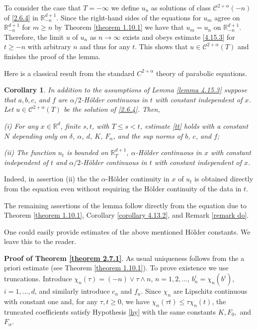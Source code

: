 \documentclass[reqno,12pt]{amsart}
\newtheorem{corollary}[theorem]{Corollary}
\theoremstyle{definition}
\theoremstyle{remark}
\begin{document}
To consider the case that $T=-\infty$ we define $u_{n}$ as
solutions of class ${\mathcal{C}}^{2+\alpha}(-n)$ of \eqref{2.6.4} in
${\mathbb{R}}^{d+1}_{-n}$. Since the right-hand sides of the equations for
$u_{m}$ agree on ${\mathbb{R}}^{d+1}_{-n}$ for $m\geq n$ by Theorem
\ref{theorem 1.10.1} we have that $u_{m}=u_{n}$ on
${\mathbb{R}}^{d+1}_{-n}$. Therefore, the limit $u$ of $u_{n}$ as $n\to\infty$
exists and obeys estimate \eqref{4.15.3} for $t\geq-n$ 
with arbitrary  $n$ and thus for any $t$. This
  shows that
$u\in{\mathcal{C}}^{2+\alpha}(T)$ and finishes the proof of the lemma.

Here is a classical  result from the standard $C^{2+\alpha}$
theory of parabolic equations.

 
\begin{corollary}
                                                \label{corollary 4.15.1}
 In addition to the assumptions of Lemma \ref{lemma 4.15.3} suppose
 that $a,b,c$, and $f$ are $\alpha/2$-H\"older continuous in $t$
 with constant independent of $x$. Let $u \in {\mathcal{C}}^{2+\alpha}(T)$
  be the solution
   of \eqref{2.6.4}.  Then,

(i)  For any $x \in {\mathbb{R}}^d$, finite $ s, t$,
   with $T \le s < t $, estimate \eqref{tt} holds with a
   constant $N$ depending only  on
 $\delta$, $\alpha$, $d$,  $K$, $F_{\alpha}$, and
   the sup norms of $b$, $c$, and
 $f$;

(ii) The function
   $u_{t}$ is bounded on ${\mathbb{R}}^{d+1}_{T}$,
 $\alpha$-H\"older continuous in $x$ with constant independent of
 $t$ and $\alpha/2$-H\"older continuous in $t$ with constant
independent of $x$.
\end{corollary}
 
 Indeed, in    assertion (ii) the
  the
 $\alpha $-H\"older continuity in $x$
of
$u_{t}$   is obtained
directly from the equation  even without requiring the H\"older
continuity of the data in $t$.

The remaining assertions of the lemma
  follow  directly from the equation due to 
Theorem \ref{theorem 1.10.1},
 Corollary
\ref{corollary 4.13.2},
  and   Remark \ref{remark do}.

One could easily provide   estimates of the above mentioned
H\"older constants. We leave this to the reader.

{\bf Proof of Theorem \ref{theorem 2.7.1}}.  As usual uniqueness
follows from the a priori estimate (see  Theorem \ref{theorem
1.10.1}). To prove existence we use truncations. Introduce
$\chi_{n}(\tau)=(-n)\vee \tau\wedge n$, $n = 1,2,...$,
   $b^{i}_{n}=\chi_{n}(b^{i})$, $i = 1, \ldots, d$, and similarly
introduce $c_{n}$ and $f_{n}$. Since $\chi_{n}$ are Lipschitz
continuous with constant one and, for any $\tau,t\geq0$, we have
$\chi_{n}(\tau t)\leq\tau\chi_{n}(t)$, the truncated coefficients
satisfy Hypothesis \ref{hy} with the same constants $K,F_{0},$ and
$F_{\alpha}$.
\end{document}
